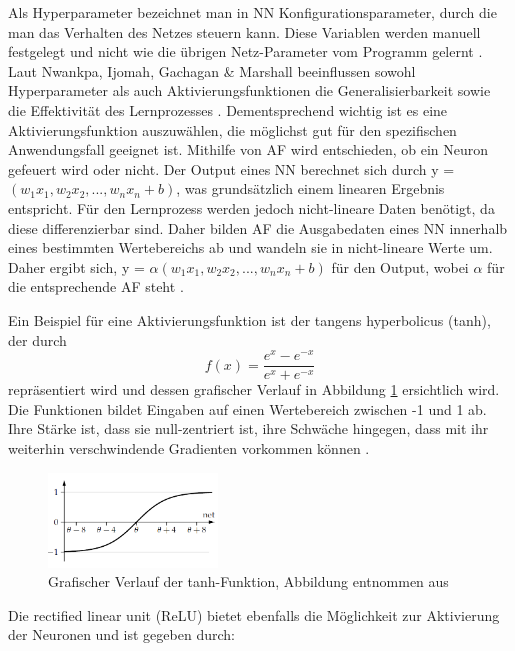\documentclass[12pt,a4paper]{article}
\begin{document}
Als Hyperparameter bezeichnet man in NN Konfigurationsparameter, durch die man das Verhalten des Netzes steuern kann. Diese Variablen werden manuell festgelegt und nicht wie die übrigen Netz-Parameter vom Programm gelernt \cite[S. 113]{Goodfellow2015}.
Laut Nwankpa, Ijomah, Gachagan \& Marshall beeinflussen sowohl Hyperparameter als auch Aktivierungsfunktionen die Generalisierbarkeit sowie die Effektivität des Lernprozesses \cite{Nwankpa2018}. Dementsprechend wichtig ist es eine Aktivierungsfunktion auszuwählen, die möglichst gut für den spezifischen Anwendungsfall geeignet ist. Mithilfe von AF wird entschieden, ob ein Neuron gefeuert wird oder nicht. Der Output eines NN berechnet sich durch y = $(w_{1}x_{1}, w_{2}x_{2}, ..., w_{n}x_{n} + b)$, was grundsätzlich einem linearen Ergebnis entspricht. Für den Lernprozess werden jedoch nicht-lineare Daten benötigt, da diese differenzierbar sind. Daher bilden AF die Ausgabedaten eines NN innerhalb eines bestimmten Wertebereichs ab und wandeln sie in nicht-lineare Werte um. Daher ergibt sich, y = $ \alpha (w_{1}x_{1}, w_{2}x_{2}, ..., w_{n}x_{n} + b)$ für den Output, wobei $\alpha $ für die entsprechende AF steht \cite{Nwankpa2018}.

Ein Beispiel für eine Aktivierungsfunktion ist der tangens hyperbolicus (tanh), der durch 
\begin{equation}
f(x) = \frac{e^x - e^{-x}}{e^x + e^{-x}}
\end{equation}
repräsentiert wird \cite{Nwankpa2018} und dessen grafischer Verlauf in Abbildung \ref{fig:tanh} ersichtlich wird. Die Funktionen bildet Eingaben auf einen Wertebereich zwischen -1 und 1 ab. Ihre Stärke ist, dass sie null-zentriert ist, ihre Schwäche hingegen, dass mit ihr weiterhin verschwindende Gradienten vorkommen können \cite{Nwankpa2018}.

\begin{figure}
\centering
\includegraphics[width=0.4\textwidth]{pics/tanh.png}	
\caption{Grafischer Verlauf der tanh-Funktion, Abbildung entnommen aus \cite[S. 45]{Kruse2015}}
\label{fig:tanh}
\end{figure}

Die rectified linear unit (ReLU) bietet ebenfalls die Möglichkeit zur Aktivierung der Neuronen und ist gegeben durch:
\end{document}
